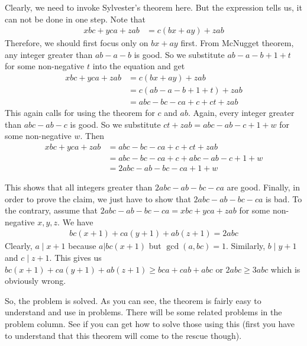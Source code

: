 \documentclass{subfile}
\begin{document}
	\begin{solution}
		Clearly, we need to invoke Sylvester's theorem here. But the expression tells us, it can not be done in one step. Note that
			\begin{align*}
				xbc+yca+zab & = c(bx+ay)+zab
			\end{align*}
		Therefore, we should first focus only on $bx+ay$ first. From McNugget theorem, any integer greater than $ab-a-b$ is good. So we substitute $ab-a-b+1+t$ for some non-negative $t$ into the equation and get
			\begin{align*}
				xbc+yca+zab & = c(bx+ay)+zab\\
							& = c(ab-a-b+1+t)+zab\\
							& = abc-bc-ca+c+ct+zab
			\end{align*}
		This again calls for using the theorem for $c$ and $ab$. Again, every integer greater than $abc-ab-c$ is good. So we substitute $ct+zab=abc-ab-c+1+w$ for some non-negative $w$. Then
			\begin{align*}
				xbc+yca+zab & = abc-bc-ca+c+ct+zab\\
							& = abc-bc-ca+c+abc-ab-c+1+w\\
							& = 2abc-ab-bc-ca+1+w
			\end{align*}
	\end{solution}
This shows that all integers greater than $2abc-ab-bc-ca$ are good.	Finally, in order to prove the claim, we just have to show that $2abc-ab-bc-ca$ is bad. To the contrary, assume that $2abc-ab-bc-ca=xbc+yca+zab$ for some non-negative $x,y,z$. We have
	\begin{align*}
		bc(x+1)+ca(y+1)+ab(z+1)=2abc
	\end{align*}
Clearly, $a\mid x+1$ because $a|bc(x+1)$ but $\gcd(a,bc)=1$. Similarly, $b\mid y+1$ and $c\mid z+1$. This gives us $bc(x+1)+ca(y+1)+ab(z+1)\geq bca+cab+abc$ or $2abc\geq3abc$ which is obviously wrong.

So, the problem is solved. As you can see, the theorem is fairly easy to understand and use in problems. There will be some related problems in the problem column. See if you can get how to solve those using this (first you have to understand that this theorem will come to the rescue though).
\end{document}

